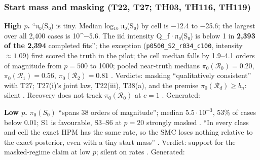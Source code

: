 \subsubsection{Start mass and masking (T22, T27; TH03, TH116, TH119)}
\textbf{High $p$.} ``π₀(S₀) is tiny. Median log₁₀ π₀(S₀) by cell is −12.4 to −25.6; the largest over all 2,400 cases is 10\textasciicircum−5.6.
The iid intensity Q\_f·π₀(S₀) is below 1 in \textbf{2,393 of the 2,394} completed fits''; the exception (\texttt{p0500\_S2\_r034\_c100},
intensity $\approx1.09$) first scored the truth in the pilot; the cell median falls by 1.9--4.1 orders of magnitude from $p=500$ to
1000; pooled near-truth medians $\pi_0(\mathcal R_0)=0.20$, $\pi_0(\mathcal R_1)=0.56$, $\pi_0(\mathcal R_2)=0.81$
. Verdicts: masking ``qualitatively consistent'' with T27;
T27(i)'s joint law, T22(iii), T38(a), and the premise $\pi_0(\mathcal R_d)\ge b_n$: silent
. Recovery does not track $\pi_0(\mathcal R_0)$ at $c=1$
. Generated:


\textbf{Low $p$.} $\pi_0(S_0)$ ``spans 38 orders of magnitude''; median $5.5\cdot10^{-3}$, 53\% of cases below 0.01; S1 is favourable,
S3--S6 at $p=20$ strongly masked . ``In every class and cell the exact
HPM has the same rate, so the SMC loses nothing relative to the exact posterior, even with a tiny start mass''
. Verdict: support for the masked-regime claim at low $p$; silent on
rates . Generated:



